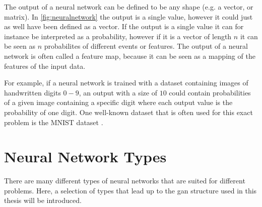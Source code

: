 The output of a neural network can be defined to be any shape (e.g. a vector, or matrix). In \cref{fig:neuralnetwork} the output is a single value, however it could just as well have been defined as a vector. If the output is a single value it can for instance be interpreted as a probability, however if it is a vector of length $n$ it can be seen as $n$ probabilites of different events or features. The output of a neural network is often called a feature map, because it can be seen as a mapping of the features of the input data. 

For example, if a neural network is trained with a dataset containing images of handwritten digits $0-9$, an output with a size of $10$ could contain probabilities of a given image containing a specific digit where each output value is the probability of one digit. One well-known dataset that is often used for this exact problem is the MNIST dataset \cite{mnist}.


\section{Neural Network Types}
There are many different types of neural networks that are suited for different problems. Here, a selection of types that lead up to the \gls{gan} structure used in this thesis will be introduced. 

